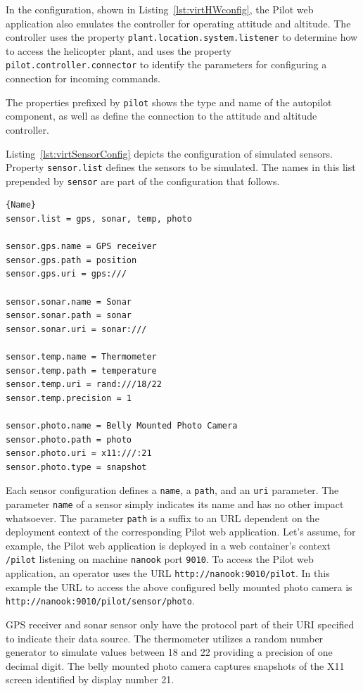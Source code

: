 In the configuration, shown in Listing~\ref{lst:virtHWconfig}, the
Pilot web application also emulates the controller for operating attitude and altitude. The controller uses
the property \texttt{plant.location.system.listener} to determine how to access the helicopter plant, and
uses the property \texttt{pilot.controller.connector} to identify the parameters for configuring a connection
for incoming commands.

The properties prefixed by \texttt{pilot} shows the type and name of the autopilot component, as well as
define the connection to the attitude and altitude controller.

Listing~\ref{lst:virtSensorConfig} depicts the configuration of simulated sensors. Property \texttt{sensor.list}
defines the sensors to be simulated. The names in this list prepended by \texttt{sensor} are part of the 
configuration that follows.
\lstset{tabsize=3,language=Tex}
\begin{lstlisting}[caption={Sensor Configuration Example},mathescape=true,label=lst:virtSensorConfig]{Name}
sensor.list = gps, sonar, temp, photo

sensor.gps.name = GPS receiver
sensor.gps.path = position
sensor.gps.uri = gps:///

sensor.sonar.name = Sonar
sensor.sonar.path = sonar
sensor.sonar.uri = sonar:///

sensor.temp.name = Thermometer
sensor.temp.path = temperature
sensor.temp.uri = rand:///18/22
sensor.temp.precision = 1

sensor.photo.name = Belly Mounted Photo Camera
sensor.photo.path = photo
sensor.photo.uri = x11:///:21
sensor.photo.type = snapshot
\end{lstlisting}
Each sensor configuration defines a \texttt{name}, a \texttt{path}, and an \texttt{uri} parameter.
The parameter \texttt{name} of a sensor simply indicates its name and has no other impact whatsoever.
The parameter \texttt{path} is a suffix to an \acs{URL} dependent on the deployment context of the corresponding
Pilot web application. Let's assume, for example, the Pilot web application is deployed in a
web container's context \texttt{/pilot} listening on machine \texttt{nanook} port \texttt{9010}.
To access the Pilot web application, an operator uses the \acs{URL} \texttt{http://nanook:9010/pilot}. In this
example the \acs{URL} to access the above configured belly mounted photo camera is
\texttt{http://nanook:9010/pilot/sensor/photo}. 

GPS receiver and sonar sensor only have the protocol part of their \acs{URI} specified to indicate their data source.
The thermometer utilizes a random number generator to simulate values between \unit{18}{\celsius} and
\unit{22}{\celsius} providing a precision of one decimal digit.  
The belly mounted photo camera captures snapshots of the X11 screen identified by display number 21.

